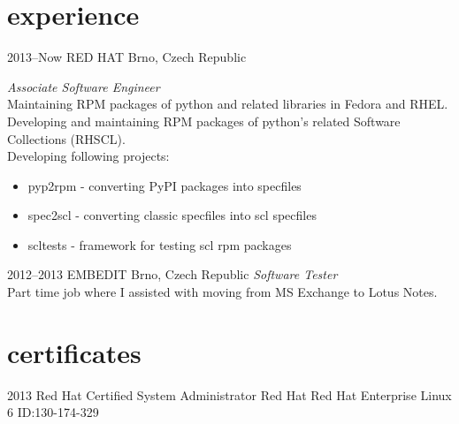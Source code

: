 \documentclass[]{friggeri-cv} %
\begin{document}

\section{experience}


\begin{entrylist}


\entry
{2013--Now}
{RED HAT}
{Brno, Czech Republic}
{\emph{Associate Software Engineer} \\
Maintaining RPM packages of python and related libraries in Fedora and RHEL.\\
Developing and maintaining RPM packages of python's related Software Collections (RHSCL).\\
Developing following projects:
\begin{itemize}
\item pyp2rpm - converting PyPI packages into specfiles
\item spec2scl - converting classic specfiles into scl specfiles
\item scltests - framework for testing scl rpm packages
\end{itemize}}


\entry
{2012--2013}
{EMBEDIT}
{Brno, Czech Republic}
{\emph{Software Tester} \\
Part time job where I assisted with moving from MS Exchange to Lotus Notes.}

\end{entrylist}



\section{certificates}

\begin{entrylist}


\entry
{2013}
{Red Hat Certified System Administrator}
{Red Hat}
{Red Hat Enterprise Linux 6 ID:130-174-329}


\end{entrylist}
\end{document}
